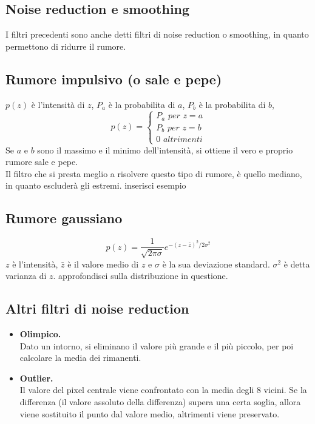 \documentclass{report}
\begin{document}
	\subsection{Noise reduction e smoothing}
	I filtri precedenti sono anche detti filtri di noise reduction o smoothing, in quanto permettono di ridurre il rumore.
		
	\subsection{Rumore impulsivo (o sale e pepe)}
	$p(z)$ è l'intensità di $z$, $P_a$ è la probabilita di $a$, $P_b$ è la probabilita di $b$, 
	$$
	p(z) = \begin{cases}
	P_a \textit{ per }z=a \\
	P_b \textit{ per }z=b \\
	0 \textit{ altrimenti}
	\end{cases}
	$$
	Se $a$ e $b$ sono il massimo e il minimo dell'intensità, si ottiene il vero e proprio rumore sale e pepe.\\
	Il filtro che si presta meglio a risolvere questo tipo di rumore, è quello mediano, in quanto escluderà gli estremi.
	inserisci esempio
	\subsection{Rumore gaussiano}
		
	$$
	p(z) = \frac{1}{\sqrt{2 \pi \sigma}}e^{-(z-\bar{z})^2/2\sigma^2}
	$$
	$z$ è l'intensità, $\bar{z}$ è il valore medio di $z$ e $\sigma$ è la sua deviazione standard. $\sigma^2$ è detta varianza di $z$. approfondisci sulla distribuzione in questione.
	\subsection{Altri filtri di noise reduction}
	\begin{itemize}
		\item \textbf{Olimpico.}\\
		      Dato un intorno, si eliminano il valore più grande e il più piccolo, per poi calcolare la media dei rimanenti.
		\item \textbf{Outlier.}\\
		      Il valore del pixel centrale viene confrontato con la media degli 8 vicini. Se la differenza (il valore assoluto della differenza) supera una certa soglia, allora viene sostituito il punto dal valore medio, altrimenti viene preservato.
	\end{itemize}
		
\end{document}
